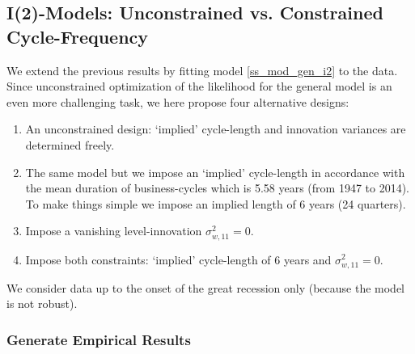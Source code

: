 \documentclass[a4paper]{book}
\begin{document}
\subsection{I(2)-Models: Unconstrained vs. Constrained Cycle-Frequency}

We extend the previous results by fitting model \ref{ss_mod_gen_i2} to the data. Since unconstrained optimization of the likelihood for the general model is an even more challenging task, we here propose four alternative designs:
\begin{enumerate}
\item An unconstrained design: `implied' cycle-length and innovation variances are determined freely.
\item The same model but we impose an `implied'  cycle-length in accordance with the mean duration of business-cycles which is 5.58 years (from 1947 to 2014). To make things simple we impose an implied length of 6 years (24 quarters). 
\item Impose a vanishing level-innovation $\sigma_{w,11}^2=0$.
\item Impose both constraints: `implied' cycle-length of 6 years and  $\sigma_{w,11}^2=0$.
\end{enumerate}
We consider data up to the onset of the great recession only (because the model is not robust).


\subsubsection{Generate Empirical Results}
\end{document}
